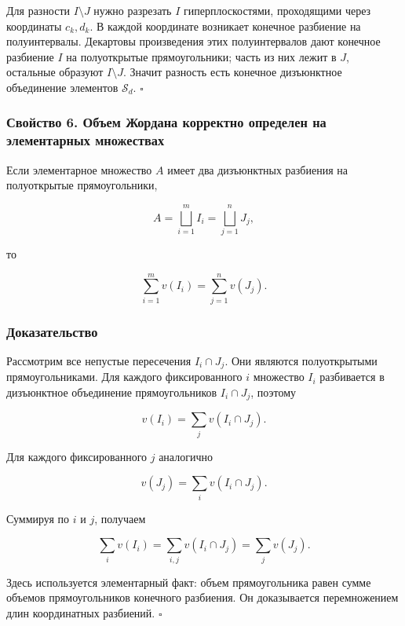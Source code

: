 \documentclass[
  11pt,
  a4paper,
]{article}
\begin{document}
Для разности \(I\setminus J\) нужно разрезать \(I\) гиперплоскостями,
проходящими через координаты \(c_k,d_k\). В каждой координате возникает
конечное разбиение на полуинтервалы. Декартовы произведения этих
полуинтервалов дают конечное разбиение \(I\) на полуоткрытые
прямоугольники; часть из них лежит в \(J\), остальные образуют
\(I\setminus J\). Значит разность есть конечное дизъюнктное объединение
элементов \(\mathcal S_d\). \(\square\)

\subsubsection{Свойство 6. Объем Жордана корректно определен на
элементарных
множествах}\label{ux441ux432ux43eux439ux441ux442ux432ux43e-6.-ux43eux431ux44aux435ux43c-ux436ux43eux440ux434ux430ux43dux430-ux43aux43eux440ux440ux435ux43aux442ux43dux43e-ux43eux43fux440ux435ux434ux435ux43bux435ux43d-ux43dux430-ux44dux43bux435ux43cux435ux43dux442ux430ux440ux43dux44bux445-ux43cux43dux43eux436ux435ux441ux442ux432ux430ux445}

Если элементарное множество \(A\) имеет два дизъюнктных разбиения на
полуоткрытые прямоугольники,

\[
A=\bigsqcup_{i=1}^m I_i=\bigsqcup_{j=1}^n J_j,
\]

то

\[
\sum_{i=1}^m v(I_i)=\sum_{j=1}^n v(J_j).
\]

\subsubsection{Доказательство}\label{ux434ux43eux43aux430ux437ux430ux442ux435ux43bux44cux441ux442ux432ux43e-5}

Рассмотрим все непустые пересечения \(I_i\cap J_j\). Они являются
полуоткрытыми прямоугольниками. Для каждого фиксированного \(i\)
множество \(I_i\) разбивается в дизъюнктное объединение прямоугольников
\(I_i\cap J_j\), поэтому

\[
v(I_i)=\sum_j v(I_i\cap J_j).
\]

Для каждого фиксированного \(j\) аналогично

\[
v(J_j)=\sum_i v(I_i\cap J_j).
\]

Суммируя по \(i\) и \(j\), получаем

\[
\sum_i v(I_i)=\sum_{i,j}v(I_i\cap J_j)=\sum_j v(J_j).
\]

Здесь используется элементарный факт: объем прямоугольника равен сумме
объемов прямоугольников конечного разбиения. Он доказывается
перемножением длин координатных разбиений. \(\square\)
\end{document}
